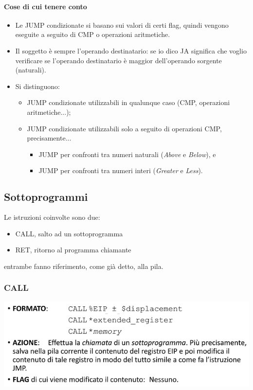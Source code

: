 \documentclass[11pt]{report}
\begin{document}
\paragraph{Cose di cui tenere conto}
\begin{itemize}
\item Le JUMP condizionate si basano sui valori di certi flag, quindi vengono eseguite a seguito di CMP o operazioni aritmetiche.
\item Il soggetto è sempre l'operando destinatario: se io dico JA significa che voglio verificare se l'operando destinatario è maggior dell'operando sorgente (naturali).
\item Si distinguono:
\begin{itemize}
\item JUMP condizionate utilizzabili in qualunque caso (CMP, operazioni aritmetiche...);
\item JUMP condizionate utilizzabili solo a seguito di operazioni CMP, precisamente...
\begin{itemize}
\item JUMP per confronti tra numeri naturali (\emph{Above} e \emph{Below}), e
\item JUMP per confronti tra numeri interi (\emph{Greater} e \emph{Less}).
\end{itemize}
\end{itemize}
\end{itemize}

\subsection{Sottoprogrammi}
Le istruzioni coinvolte sono due:
\begin{itemize}
\item CALL, salto ad un sottoprogramma
\item RET, ritorno al programma chiamante
\end{itemize}
entrambe fanno riferimento, come già detto, alla pila.
\subsubsection{CALL}
\begin{center}
\includegraphics{img/44.PNG}
\end{center}
\end{document}
